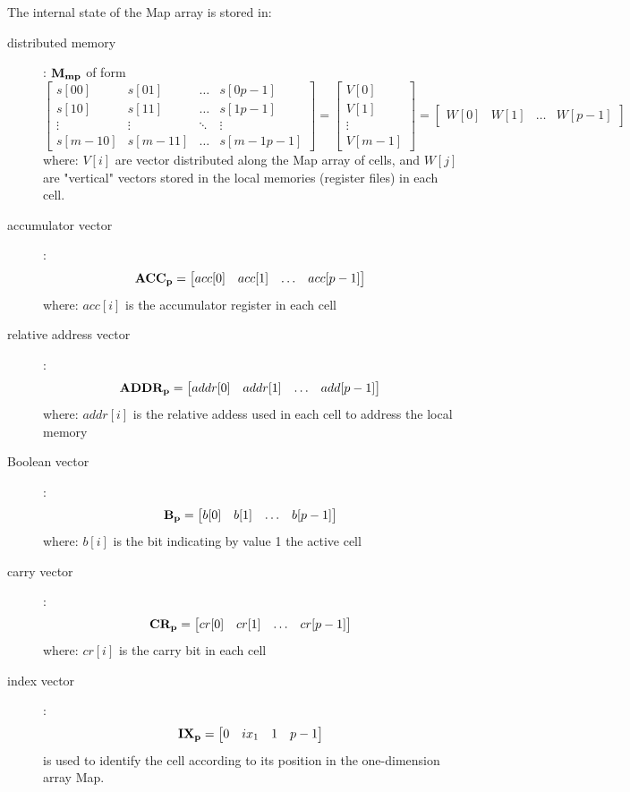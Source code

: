 The internal state of the Map array is stored in:
\begin{description}
    \item[distributed memory]: ${\bf M_{mp}}$  of form \\
    \[
   \begin{bmatrix}
    s[00] & s[01] & \dots  & s[0 p-1]\\
    s[10] & s[11] & \dots  & s[1 p-1]\\
    \vdots & \vdots & \ddots & \vdots\\
    s[m-1 0] & s[m-1 1] & \dots  & s[m-1 p-1]
    \end{bmatrix} = 
    \begin{bmatrix}
    V[0] \\
    V[1] \\
    \vdots \\
    V[m-1] 
    \end{bmatrix} =
    \begin{bmatrix}
    W[0] & W[1] & \dots  & W[p-1]
    \end{bmatrix}
    \]
    where: $V[i]$ are vector distributed along the Map array of cells, and $W[j]$ are "vertical" vectors stored in the local memories (register files) in each cell.
    \item[accumulator vector]:
     \[
    {\bf ACC_{p}} = \begin{bmatrix}
    acc[0] & acc[1] & \dots  & acc[p-1]
    \end{bmatrix}
    \]
    where: $acc[i]$ is the accumulator register in each cell
    \item[relative address vector]:
    \[
    {\bf ADDR_{p}} = \begin{bmatrix}
    addr[0] & addr[1] & \dots  & add[p-1]
    \end{bmatrix}
    \]
    where: $addr[i]$ is the relative addess used in each cell to address the local memory
    \item[Boolean vector]:
    \[
    {\bf B_{p}} = \begin{bmatrix}
    b[0] & b[1] & \dots  & b[p-1]
    \end{bmatrix}
    \]
    where: $b[i]$ is the bit indicating by value 1 the active cell 
    \item[carry vector]:
    \[
    {\bf CR_{p}} = \begin{bmatrix}
    cr[0] & cr[1] & \dots  & cr[p-1]
    \end{bmatrix}
    \]
    where: $cr[i]$ is the carry bit in each cell
    \item[index vector]:
    \[
    {\bf IX_{p}} = \begin{bmatrix}
    0 & ix_{1} & 1  & p-1
    \end{bmatrix}
    \]
    is used to identify the cell according to its position in the one-dimension array Map.
\end{description}

